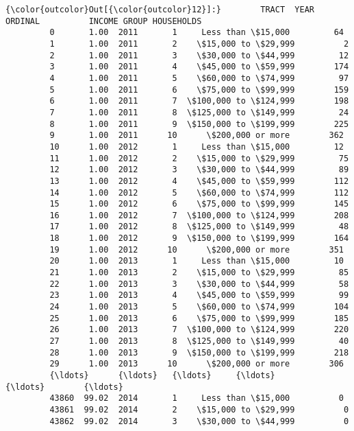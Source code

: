 \documentclass[11pt]{article}
\begin{document}
\begin{Verbatim}[commandchars=\\\{\}]
{\color{outcolor}Out[{\color{outcolor}12}]:}        TRACT  YEAR ORDINAL          INCOME GROUP HOUSEHOLDS
         0       1.00  2011       1     Less than \$15,000         64
         1       1.00  2011       2    \$15,000 to \$29,999          2
         2       1.00  2011       3    \$30,000 to \$44,999         12
         3       1.00  2011       4    \$45,000 to \$59,999        174
         4       1.00  2011       5    \$60,000 to \$74,999         97
         5       1.00  2011       6    \$75,000 to \$99,999        159
         6       1.00  2011       7  \$100,000 to \$124,999        198
         7       1.00  2011       8  \$125,000 to \$149,999         24
         8       1.00  2011       9  \$150,000 to \$199,999        225
         9       1.00  2011      10      \$200,000 or more        362
         10      1.00  2012       1     Less than \$15,000         12
         11      1.00  2012       2    \$15,000 to \$29,999         75
         12      1.00  2012       3    \$30,000 to \$44,999         89
         13      1.00  2012       4    \$45,000 to \$59,999        112
         14      1.00  2012       5    \$60,000 to \$74,999        112
         15      1.00  2012       6    \$75,000 to \$99,999        145
         16      1.00  2012       7  \$100,000 to \$124,999        208
         17      1.00  2012       8  \$125,000 to \$149,999         48
         18      1.00  2012       9  \$150,000 to \$199,999        164
         19      1.00  2012      10      \$200,000 or more        351
         20      1.00  2013       1     Less than \$15,000         10
         21      1.00  2013       2    \$15,000 to \$29,999         85
         22      1.00  2013       3    \$30,000 to \$44,999         58
         23      1.00  2013       4    \$45,000 to \$59,999         99
         24      1.00  2013       5    \$60,000 to \$74,999        104
         25      1.00  2013       6    \$75,000 to \$99,999        185
         26      1.00  2013       7  \$100,000 to \$124,999        220
         27      1.00  2013       8  \$125,000 to \$149,999         40
         28      1.00  2013       9  \$150,000 to \$199,999        218
         29      1.00  2013      10      \$200,000 or more        306
         {\ldots}      {\ldots}   {\ldots}     {\ldots}                   {\ldots}        {\ldots}
         43860  99.02  2014       1     Less than \$15,000          0
         43861  99.02  2014       2    \$15,000 to \$29,999          0
         43862  99.02  2014       3    \$30,000 to \$44,999          0

\end{Verbatim}
\end{document}
